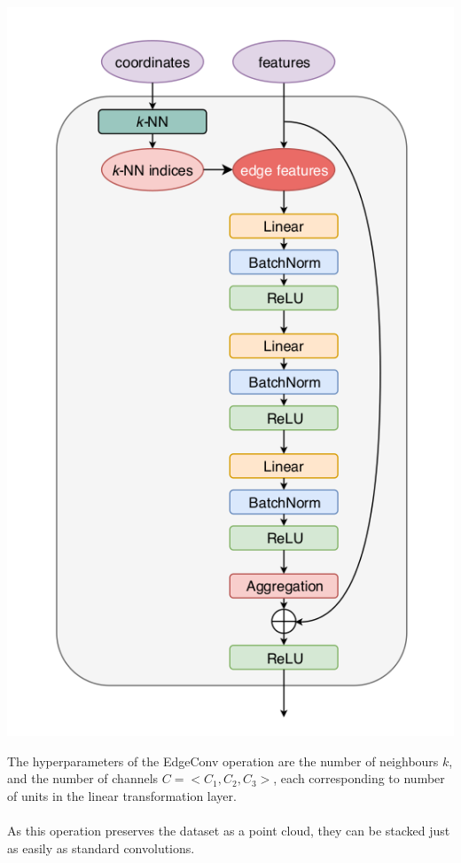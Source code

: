 \begin{center}
    \includegraphics[scale=0.3]{img/theory-ml-particlenet/edge-conv.png}
\end{center}

\noindent The hyperparameters of the EdgeConv operation are the number of 
neighbours $k$, and the number of channels $C = <C_1,C_2,C_3>$, each 
corresponding to  number of units in the linear transformation layer.
\\\\
As this operation preserves the dataset as a point cloud, they 
can be stacked just as easily as standard convolutions.

